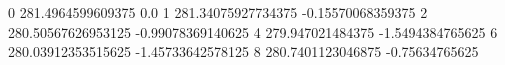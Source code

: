 0 281.4964599609375 0.0
1 281.34075927734375 -0.15570068359375
2 280.50567626953125 -0.99078369140625
4 279.947021484375 -1.5494384765625
6 280.03912353515625 -1.45733642578125
8 280.7401123046875 -0.75634765625
